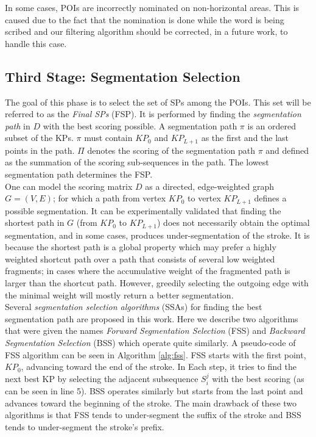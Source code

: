 \documentclass[10pt, conference, compsocconf]{IEEEtran}
\begin{document}
In some cases, POIs are incorrectly nominated on non-horizontal areas. This is caused due to the fact that the nomination is done while the word is being scribed and our filtering algorithm should be corrected, in a future work, to handle this case.\\

\subsection{Third Stage: Segmentation Selection}
The goal of this phase is to select the set of SPs among the POIs. 
This set will be referred to as the \emph{Final SPs} (FSP). 
It is performed by finding the \emph{segmentation path} in $D$ with the best scoring possible. 
A segmentation path $\pi$ is an ordered subset of the KPs. 
$\pi$ must contain $KP_{0}$ and $KP_{L+1}$ as the first and the last points in the path.
$\Pi$ denotes the scoring of the segmentation path $\pi$ and defined as the summation of the scoring sub-sequences in the path. 
The lowest segmentation path determines the FSP.\\

One can model the scoring matrix $D$ as a directed, edge-weighted graph $G=(V,E)$; for which a path from vertex $KP_0$ to vertex $KP_{L+1}$ defines a possible segmentation. 
It can be experimentally validated that finding the shortest path in $G$ (from $KP_0$ to $KP_{L+1}$) does not necessarily obtain the optimal segmentation, and in some cases, produces under-segmentation of the stroke. 
It is because the shortest path is a global property which may prefer a highly weighted shortcut path over a path that consists of several low weighted fragments; in cases where the accumulative weight of the fragmented path is larger than the shortcut path.
However, greedily selecting the outgoing edge with the minimal weight will mostly return a better segmentation.\\

Several \emph{segmentation selection algorithms} (SSAs) for finding the best segmentation path are proposed in this work.
Here we describe two algorithms that were given the names \emph{Forward Segmentation Selection} (FSS) and \emph{Backward Segmentation Selection} (BSS) which operate quite similarly. 
A pseudo-code of FSS algorithm can be seen in Algorithm \ref{alg:fss}. 
FSS starts with the first point, $KP_0$, advancing toward the end of the stroke. 
In Each step, it tries to find the next best KP by selecting the adjacent subsequence $S_i^j$ with the best scoring (as can be seen in line 5). 
BSS operates similarly but starts from the last point and advances toward the beginning of the stroke. 
The main drawback of these two algorithms is that FSS tends to under-segment the suffix of the stroke and BSS tends to under-segment the stroke's prefix.\\
\end{document}
